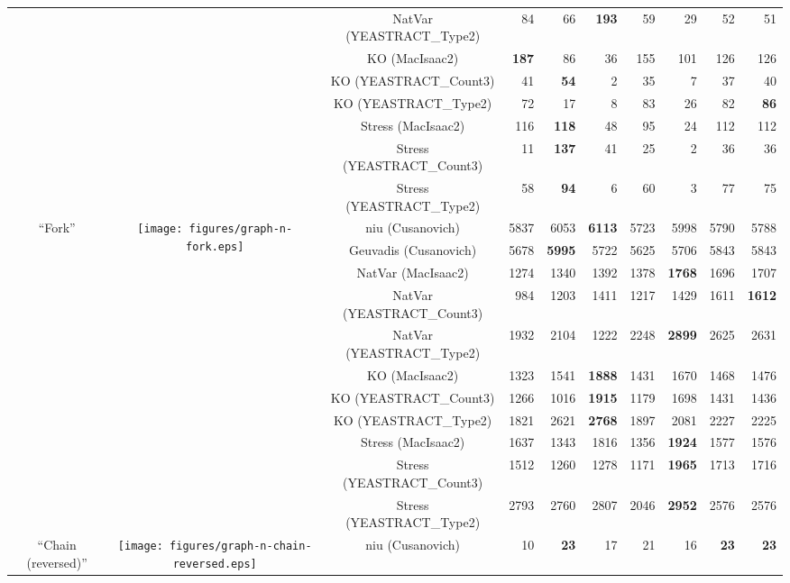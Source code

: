 \begin{table*}[t]
\begin{adjustbox}{max width=\textwidth}
\begin{tabular}{cccrrrrrrr}
  &   & NatVar (YEASTRACT\_Type2) & 84 & 66 & \textbf{193} & 59 & 29 & 52 & 51 \\
  &   & KO (MacIsaac2) & \textbf{187} & 86 & 36 & 155 & 101 & 126 & 126 \\
  &   & KO (YEASTRACT\_Count3) & 41 & \textbf{54} & 2 & 35 & 7 & 37 & 40 \\
  &   & KO (YEASTRACT\_Type2) & 72 & 17 & 8 & 83 & 26 & 82 & \textbf{86} \\
  &   & Stress (MacIsaac2) & 116 & \textbf{118} & 48 & 95 & 24 & 112 & 112 \\
  &   & Stress (YEASTRACT\_Count3) & 11 & \textbf{137} & 41 & 25 & 2 & 36 & 36 \\
  &   & Stress (YEASTRACT\_Type2) & 58 & \textbf{94} & 6 & 60 & 3 & 77 & 75 \\
\midrule
\multirow{11}{*}{``Fork''} & \multirow{11}{*}{\texttt{[image: figures/graph-n-fork.eps]}} & niu (Cusanovich) & 5837 & 6053 & \textbf{6113} & 5723 & 5998 & 5790 & 5788 \\
  &   & Geuvadis (Cusanovich) & 5678 & \textbf{5995} & 5722 & 5625 & 5706 & 5843 & 5843 \\
  &   & NatVar (MacIsaac2) & 1274 & 1340 & 1392 & 1378 & \textbf{1768} & 1696 & 1707 \\
  &   & NatVar (YEASTRACT\_Count3) & 984 & 1203 & 1411 & 1217 & 1429 & 1611 & \textbf{1612} \\
  &   & NatVar (YEASTRACT\_Type2) & 1932 & 2104 & 1222 & 2248 & \textbf{2899} & 2625 & 2631 \\
  &   & KO (MacIsaac2) & 1323 & 1541 & \textbf{1888} & 1431 & 1670 & 1468 & 1476 \\
  &   & KO (YEASTRACT\_Count3) & 1266 & 1016 & \textbf{1915} & 1179 & 1698 & 1431 & 1436 \\
  &   & KO (YEASTRACT\_Type2) & 1821 & 2621 & \textbf{2768} & 1897 & 2081 & 2227 & 2225 \\
  &   & Stress (MacIsaac2) & 1637 & 1343 & 1816 & 1356 & \textbf{1924} & 1577 & 1576 \\
  &   & Stress (YEASTRACT\_Count3) & 1512 & 1260 & 1278 & 1171 & \textbf{1965} & 1713 & 1716 \\
  &   & Stress (YEASTRACT\_Type2) & 2793 & 2760 & 2807 & 2046 & \textbf{2952} & 2576 & 2576 \\
\midrule
\multirow{11}{*}{``Chain (reversed)''} & \multirow{11}{*}{\texttt{[image: figures/graph-n-chain-reversed.eps]}} & niu (Cusanovich) & 10 & \textbf{23} & 17 & 21 & 16 & \textbf{23} & \textbf{23} \\

\end{tabular}
\end{adjustbox}
\end{table*}
